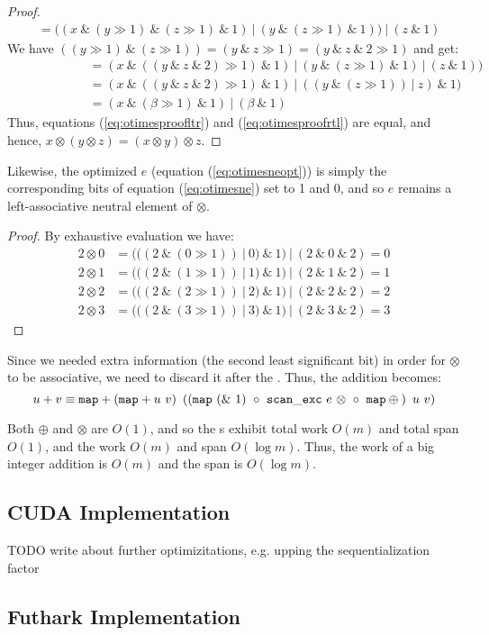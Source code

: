 \begin{proof}
\begin{align}
               &= ((x~\&~(y \gg 1)~\&~(z \gg 1)~\&~1)~|~(y~\&~(z \gg 1)~\&~1))~|~(z~\&~1)
\end{align}
We have $((y \gg 1)~\&~(z \gg 1)) = (y~\&~z \gg 1) = (y~\&~z~\&~2 \gg 1)$ and get:
\begin{align}
  &= (x~\&~((y~\&~z~\&~2) \gg 1)~\&~1)~|~(y~\&~(z \gg 1)~\&~1)~|~(z~\&~1))\\
  \phantom{((\alpha~\&~1)\&}&= (x~\&~((y~\&~z~\&~2) \gg 1)~\&~1)~|~((y~\&~(z \gg 1))~|~z)~\&~1)\\
  &= (x~\&~(\beta \gg 1)~\&~1)~|~(\beta~\&~1)
\end{align}
Thus, equations (\ref{eq:otimesproofltr}) and (\ref{eq:otimesproofrtl}) are equal, and hence, $x \otimes (y \otimes z) = (x \otimes y) \otimes z$.
\end{proof}




Likewise, the optimized $e$ (equation (\ref{eq:otimesneopt})) is simply the
corresponding bits of equation (\ref{eq:otimesne}) set to 1 and 0, and so $e$
remains a left-associative neutral element of $\otimes$.

\begin{proof} By exhaustive evaluation we have:
\begin{align}
  \label{eq:otimesneproof}
  2 \otimes 0 &= (((2~\&~(0 \gg 1))~|~0)~\&~1)~|~(2~\&~0~\&~2) = 0 \\
  2 \otimes 1 &= (((2~\&~(1 \gg 1))~|~1)~\&~1)~|~(2~\&~1~\&~2) = 1 \\
  2 \otimes 2 &= (((2~\&~(2 \gg 1))~|~2)~\&~1)~|~(2~\&~2~\&~2) = 2 \\
  2 \otimes 3 &= (((2~\&~(3 \gg 1))~|~3)~\&~1)~|~(2~\&~3~\&~2) = 3
\end{align}
\end{proof}

Since we needed extra information (the second least significant bit) in order
for $\otimes$ to be associative, we need to discard it after the . Thus, the
addition becomes:
\begin{equation}
\label{eq:addgpu1}
u + v \equiv \mathtt{map} + \left( \mathtt{map} + u~v\right)~\left(\left(\mathtt{map}~(\&~1) ~\circ ~{\mathtt{scan\_exc}~e~\otimes}~ \circ ~ \mathtt{map} \oplus \phantom{}\right)~u~v\right)
\end{equation}

Both $\oplus$ and $\otimes$ are $O(1)$, and so the s exhibit total work
$O(m)$ and total span $O(1)$, and the  work $O(m)$ and span
$O(\log m)$. Thus, the work of a big integer addition is $O(m)$ and the span is
$O(\log m)$.


\subsection{CUDA Implementation}
\label{subsec:addcud}

{\color{red} TODO write about further optimizitations, e.g. upping the sequentialization factor}

\subsection{Futhark Implementation}
\label{subsec:addfut}

